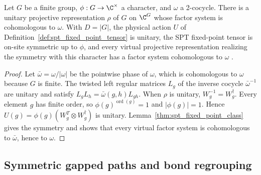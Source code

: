 \begin{lemma}
    \label{thm:spt_fixed_point_from_cocycle}
    \leanok
    Let $G$ be a finite group, $\phi:G\to\C^\times$ a character,
    and $\omega$ a 2-cocycle. There is a unitary
    projective representation $\rho$ of $G$ on $\C^G$ whose factor system is
    cohomologous to $\omega$. With $D=|G|$, the physical action $U$ of
    Definition~\ref{def:spt_fixed_point_tensor} is unitary, the SPT fixed-point
    tensor is on-site symmetric up to $\phi$, and every virtual projective
    representation realizing the symmetry with this character has a factor
    system cohomologous to $\omega$
    \cite[Section~III.A]{Cirac2021Matrix}.
\end{lemma}

\begin{proof}\leanok
    Let $\bar\omega=\omega/|\omega|$ be the pointwise phase of $\omega$, which is
    cohomologous to $\omega$ because $G$ is finite.
    The twisted left regular matrices $L_g$ of the inverse cocycle
    $\bar\omega^{-1}$ are unitary and satisfy $L_gL_h=\bar\omega(g,h)L_{gh}$.  When
    $\rho$ is unitary, $W_g^{-1}=W_g^{\dagger}$. Every element $g$ has finite
    order, so $\phi(g)^{\operatorname{ord}(g)}=1$ and $|\phi(g)|=1$.
    Hence $U(g)=\phi(g)(W_g^{T}\otimes W_g^{\dagger})$ is unitary.
    Lemma~\ref{thm:spt_fixed_point_class} gives the symmetry and shows that every virtual factor system is cohomologous to
    $\bar\omega$, hence to $\omega$.
\end{proof}



\subsection{Symmetric gapped paths and bond regrouping}
\label{sec:spt_symmetric_gapped_paths}

